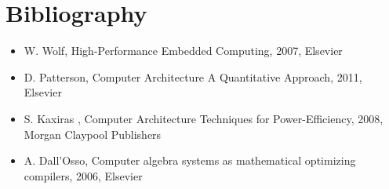 \documentclass[12pt, a4paper]{article}
\begin{document}
%
%
%
%
%


\section{Bibliography}
\begin{itemize}



\item[] W. Wolf, High-Performance Embedded Computing, 2007, Elsevier
\item[] D. Patterson, Computer Architecture A Quantitative Approach, 2011, Elsevier
\item[] S.  Kaxiras , Computer Architecture Techniques for Power-Efficiency, 2008, Morgan Claypool Publishers
\item[] A. Dall’Osso, Computer algebra systems as mathematical optimizing compilers, 2006, Elsevier
\end{itemize}

\end{document}
